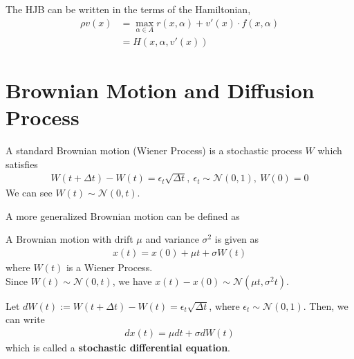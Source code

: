 \documentclass[11pt]{elegantbook}
\begin{document}
\begin{note}
    The HJB can be written in the terms of the Hamiltonian,
    \begin{equation}
        \begin{aligned}
            \rho v(x) &= \max_{\alpha\in A} r(x,\alpha) + v'(x)\cdot f(x,\alpha)\\
            & = H(x,\alpha,v'(x))
        \end{aligned}
        \nonumber
    \end{equation}
\end{note}

\section{Brownian Motion and Diffusion Process}
\begin{definition}
    A standard Brownian motion (Wiener Process) is a stochastic process $W$ which satisfies
    \begin{equation}
        \begin{aligned}
            W(t+\Delta t)-W(t)=\epsilon_t\sqrt{\Delta t},\ \epsilon_t\sim \mathcal{N}(0,1),\ W(0)=0
        \end{aligned}
        \nonumber
    \end{equation}
    We can see $W(t)\sim \mathcal{N}(0,t)$.
\end{definition}
A more generalized Brownian motion can be defined as
\begin{definition}
    A Brownian motion with drift $\mu$ and variance $\sigma^2$ is given as
    \begin{equation}
        \begin{aligned}
            x(t)=x(0)+ \mu t + \sigma W(t)
        \end{aligned}
        \nonumber
    \end{equation}
    where $W(t)$ is a Wiener Process.\\
    Since $W(t)\sim \mathcal{N}(0,t)$, we have $x(t)-x(0)\sim \mathcal{N}(\mu t,\sigma^2 t)$.
\end{definition}
Let $dW(t):=W(t+\Delta t)-W(t)=\epsilon_t\sqrt{\Delta t}$, where $\epsilon_t\sim \mathcal{N}(0,1)$. Then, we can write
\begin{equation}
    \begin{aligned}
        d x(t)= \mu dt + \sigma d W(t)
    \end{aligned}
    \nonumber
\end{equation}
which is called a \textbf{stochastic differential equation}.
\end{document}

